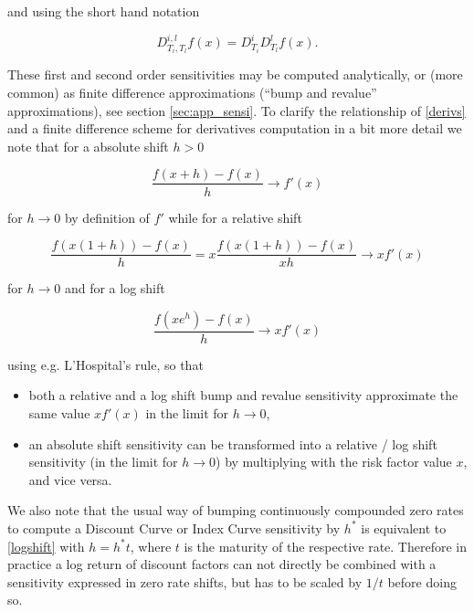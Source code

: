 and using the short hand notation

\begin{equation}\label{derivs_short}
  D^{i,l}_{T_i,T_l} f(x) = D^i_{T_i} D^l_{T_l} f(x).
\end{equation}

These first and second order sensitivities may be computed analytically, or (more common) as finite difference
approximations (``bump and revalue'' approximations), see section \ref{sec:app_sensi}. To clarify the relationship of \eqref{derivs}
and a finite difference scheme for derivatives computation in a bit more detail we note that for a absolute shift $h>0$

\begin{equation}
\frac{f(x+h)-f(x)}{h} \rightarrow f'(x)
\end{equation}

for $h\rightarrow 0$ by definition of $f'$ while for a relative shift

\begin{equation}
  \frac{f(x(1+h))-f(x)}{h} = x \frac{f(x(1+h))-f(x)}{xh} \rightarrow xf'(x)
\end{equation}

for $h\rightarrow 0$ and for a log shift

\begin{equation}\label{logshift}
\frac{f(xe^h)-f(x)}{h} \rightarrow xf'(x)
\end{equation}

using e.g. L'Hospital's rule, so that

\begin{itemize}
\item both a relative and a log shift bump and revalue sensitivity approximate the same value $xf'(x)$ in the limit for
  $h\rightarrow 0$,
\item an absolute shift sensitivity can be transformed into a relative / log shift sensitivity (in the limit for
  $h\rightarrow 0$) by multiplying with the risk factor value $x$, and vice versa.
\end{itemize}

We also note that the usual way of bumping continuously compounded zero rates to compute a Discount Curve or Index Curve
sensitivity by $h^*$ is equivalent to \eqref{logshift} with $h=h^*t$, where $t$ is the maturity of the respective
rate. Therefore in practice a log return of discount factors can not directly be combined with a sensitivity expressed
in zero rate shifts, but has to be scaled by $1/t$ before doing so.


